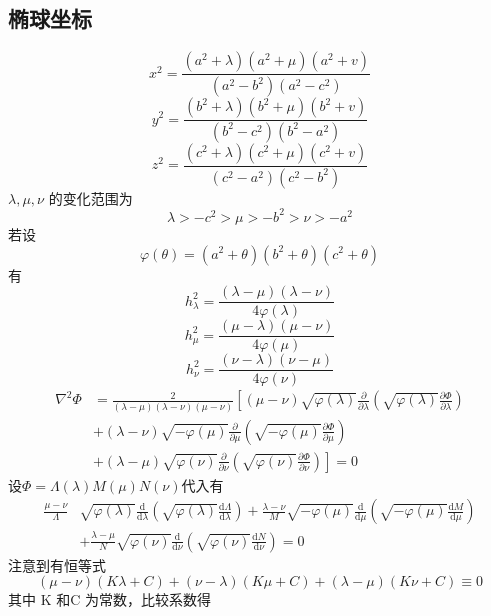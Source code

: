 \documentclass[a4paper]{ctexart}
\begin{document}
\subsection{椭球坐标}
\[
    x^{2}=\frac{\left(a^{2}+\lambda\right)\left(a^{2}+\mu\right)\left(a^{2}+v\right)}{\left(a^{2}-b^{2}\right)\left(a^{2}-c^{2}\right)}     
\]
\[
    y^{2}=\frac{\left(b^{2}+\lambda\right)\left(b^{2}+\mu\right)\left(b^{2}+v\right)}{\left(b^{2}-c^{2}\right)\left(b^{2}-a^{2}\right)}     
\]
\[
    z^{2}=\frac{\left(c^{2}+\lambda\right)\left(c^{2}+\mu\right)\left(c^{2}+v\right)}{\left(c^{2}-a^{2}\right)\left(c^{2}-b^{2}\right)}
\]
$\lambda, \mu, \nu$ 的变化范围为
\[
    \lambda>-c^{2}>\mu>-b^{2}>\nu>-a^{2}     
\]
若设
\[
    \varphi(\theta)=\left(a^{2}+\theta\right)\left(b^{2}+\theta\right)\left(c^{2}+\theta\right)
\]
有
\[
    h_{\lambda}^{2}=\frac{(\lambda-\mu)(\lambda-\nu)}{4 \varphi(\lambda)}
\]
\[
    h_{\mu}^{2}=\frac{(\mu-\lambda)(\mu-\nu)}{4 \varphi(\mu)}        
\]
\[
    h_{\nu}^{2}=\frac{(\nu-\lambda)(\nu-\mu)}{4 \varphi(\nu)}    
\]
\[
\begin{aligned}
    \nabla^{2} \Phi
    &=\frac{2}{(\lambda-\mu)(\lambda-\nu)(\mu-\nu)}\left[(\mu-\nu) \sqrt{\varphi(\lambda)} \frac{\partial}{\partial \lambda}\left(\sqrt{\varphi(\lambda)} \frac{\partial \Phi}{\partial \lambda}\right)\right. \\
    &+(\lambda-\nu) \sqrt{-\varphi(\mu)} \frac{\partial}{\partial \mu}\left(\sqrt{-\varphi(\mu)} \frac{\partial \Phi}{\partial \mu}\right) \\
    &+\left.(\lambda-\mu) \sqrt{\varphi(\nu)} \frac{\partial}{\partial \nu}\left(\sqrt{\varphi(\nu)} \frac{\partial \Phi}{\partial \nu}\right)\right]=0
\end{aligned}
\]
设$\Phi=\Lambda(\lambda) M(\mu) N(\nu)$代入有
\[
    \begin{aligned}
        \frac{\mu-\nu}{\Lambda} 
        & \sqrt{\varphi(\lambda)} \frac{\mathrm{d}}{\mathrm{d} \lambda}\left(\sqrt{\varphi(\lambda)} \frac{\mathrm{d} \Lambda}{\mathrm{d} \lambda}\right)+\frac{\lambda-\nu}{M} \sqrt{-\varphi(\mu)} \frac{\mathrm{d}}{\mathrm{d} \mu}\left(\sqrt{-\varphi(\mu)} \frac{\mathrm{d} M}{\mathrm{d} \mu}\right) \\
        &+\frac{\lambda-\mu}{N} \sqrt{\varphi(\nu)} \frac{\mathrm{d}}{\mathrm{d} \nu}\left(\sqrt{\varphi(\nu)} \frac{\mathrm{d} N}{\mathrm{d} \nu}\right)=0
        \end{aligned}    
\]
注意到有恒等式
\[
(\mu-\nu)(K \lambda+C)+(\nu-\lambda)(K \mu+C)+(\lambda-\mu)(K \nu+C) \equiv 0
\]
其中 K 和C 为常数，比较系数得
\end{document}
